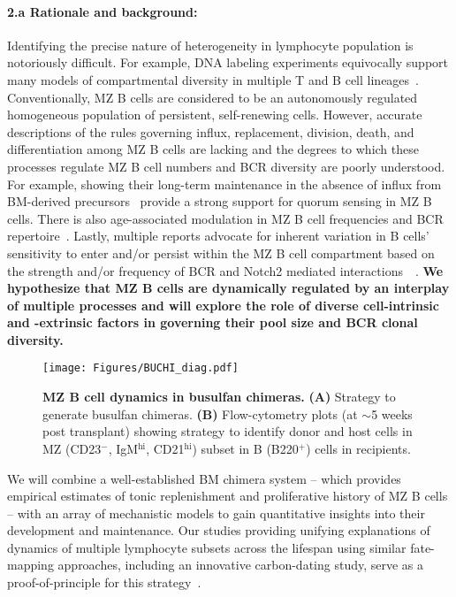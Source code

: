 \documentclass[11pt]{article}
\newcommand{\para}[1]{\vspace*{-4.5mm}\paragraph{#1}}
\newcommand{\red}[1]{{\color{red}{#1}}}
\begin{document}
\para{{2.a Rationale and background:}}
Identifying the precise nature of heterogeneity in lymphocyte population is notoriously difficult. For example, DNA labeling experiments equivocally support many models of compartmental diversity in multiple  T and B cell lineages~\red{(CITEs)}.
Conventionally, MZ B cells are considered to be an autonomously regulated homogeneous population of persistent, self-renewing cells. 
However, accurate descriptions of the rules governing influx, replacement, division, death, and differentiation among MZ B cells are lacking and the degrees to which these processes regulate MZ B cell numbers and BCR diversity are poorly understood. 
For example,  showing their long-term maintenance in the absence of influx from BM-derived precursors~\cite{Carvalho_2001, Hao_2001} provide a strong support for quorum sensing in MZ B cells.   
There is also age-associated modulation in MZ B cell frequencies and BCR repertoire~\cite{Birjandi_2011, Cortegano_2017}.
Lastly, multiple reports advocate for inherent variation in B cells' sensitivity to enter and/or persist within the MZ B cell compartment based on the strength and/or frequency of BCR and Notch2 mediated interactions~~\red{(CITEs)}. %
\textbf{We hypothesize that MZ B cells are dynamically regulated by an interplay of multiple processes and will explore the role of diverse cell-intrinsic and -extrinsic factors in governing their pool size and BCR clonal diversity.
}


\begin{wrapfigure}{r}{0.4\textwidth}
\centering
\vspace*{-7mm}
\texttt{[image: Figures/BUCHI\_diag.pdf]}
\vspace*{-6mm}
\caption{\textbf{MZ B cell dynamics in busulfan chimeras.}
\textbf{(A)} Strategy to generate busulfan chimeras.
\textbf{(B)} Flow-cytometry plots (at $\sim$5 weeks post transplant) showing strategy to identify donor and host cells in MZ (CD23$^-$, IgM$^\text{hi}$, CD21$^\text{hi}$) subset in B (B220$^+$) cells in recipients.%
}
\label{fig:BUCHI}
\vspace*{-7mm}
\end{wrapfigure}

We will combine a well-established BM chimera system -- which provides empirical estimates of tonic replenishment and proliferative history of MZ B cells -- with an array of mechanistic models to gain quantitative insights into their development and maintenance.
Our studies providing unifying explanations of dynamics of multiple lymphocyte subsets across the lifespan using similar fate-mapping approaches, including an innovative carbon-dating study, serve as a proof-of-principle for this strategy~\cite{Rane_2018, Mold_2019, Verheijen_2020, Rane_2022}.
\end{document}
